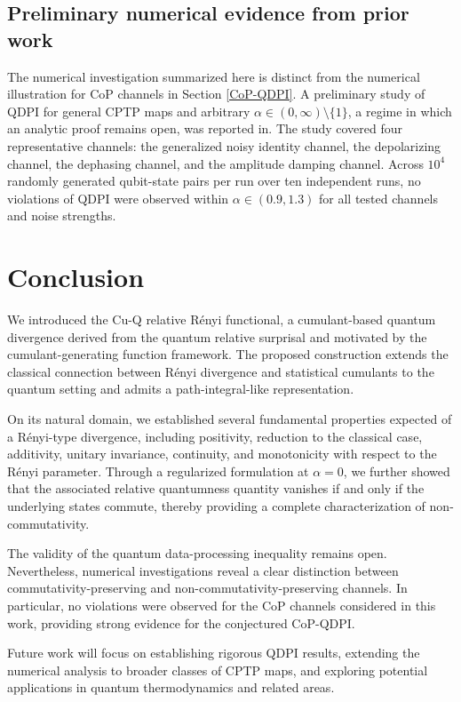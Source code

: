 \documentclass[a4paper, amsfonts, amssymb, amsmath, reprint, showkeys, nofootinbib, twoside, aps, pra]{revtex4-2}
\theoremstyle{definition}
\begin{document}
\subsection{Preliminary numerical evidence from prior work} 

The numerical investigation summarized here is distinct from the numerical illustration for CoP channels in Section \ref{CoP-QDPI}. A preliminary study of QDPI for general CPTP maps and arbitrary $\alpha\in(0,\infty)\setminus\{1\}$, a regime in which an analytic proof remains open, was reported in\cite{MeunsonDeesuwan2025CQRRF}. The study covered four representative channels: the generalized noisy identity channel, the depolarizing channel, the dephasing channel, and the amplitude damping channel. Across $10^4$ randomly generated qubit-state pairs per run over ten independent runs, no violations of QDPI were observed within $\alpha\in(0.9,1.3)$ for all tested channels and noise strengths.


\section*{Conclusion}

We introduced the Cu-Q relative Rényi functional, a cumulant-based quantum divergence derived from the quantum relative surprisal and motivated by the cumulant-generating function framework. The proposed construction extends the classical connection between Rényi divergence and statistical cumulants to the quantum setting and admits a path-integral-like representation.

On its natural domain, we established several fundamental properties expected of a Rényi-type divergence, including positivity, reduction to the classical case, additivity, unitary invariance, continuity, and monotonicity with respect to the Rényi parameter. Through a regularized formulation at $\alpha=0$, we further showed that the associated relative quantumness quantity vanishes if and only if the underlying states commute, thereby providing a complete characterization of non-commutativity.

The validity of the quantum data-processing inequality remains open. Nevertheless, numerical investigations reveal a clear distinction between commutativity-preserving and non-commutativity-preserving channels. In particular, no violations were observed for the CoP channels considered in this work, providing strong evidence for the conjectured CoP-QDPI.

Future work will focus on establishing rigorous QDPI results, extending the numerical analysis to broader classes of CPTP maps, and exploring potential applications in quantum thermodynamics and related areas.
\end{document}
